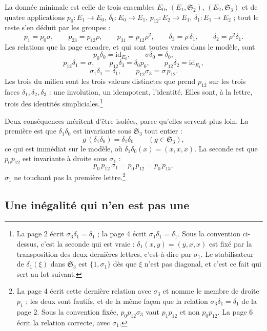 \documentclass[11pt,a4paper]{article}
\begin{document}
La donnée minimale est celle de trois ensembles $E_{0}$, $(E_{1},
\mathfrak{S}_{2})$, $(E_{2}, \mathfrak{S}_{3})$ et de quatre applications
$p_{0} \colon E_{1} \to E_{0}$, $\delta_{0} \colon E_{0} \to E_{1}$,
$p_{12} \colon E_{2} \to E_{1}$, $\delta_{1} \colon E_{1} \to E_{2}$ ; tout le
reste s'en déduit par les groupes :
\[
  p_{1} = p_{0}\sigma, \qquad
  p_{23} = p_{12}\rho, \qquad p_{31} = p_{12}\rho^{2}, \qquad
  \delta_{3} = \rho\,\delta_{1}, \qquad \delta_{2} = \rho^{2}\delta_{1}.
\]
Les relations que la page encadre, et qui sont toutes vraies dans le modèle,
sont
\[
  p_{0}\delta_{0} = \mathrm{id}_{E_{0}}, \qquad \sigma\delta_{0} = \delta_{0},
\]
\[
  p_{12}\delta_{1} = \sigma, \qquad
  p_{12}\delta_{3} = \delta_{0}p_{0}, \qquad
  p_{12}\delta_{2} = \mathrm{id}_{E_{1}},
\]
\[
  \sigma_{1}\delta_{1} = \delta_{1}, \qquad
  p_{12}\sigma_{3} = \sigma\,p_{12}.
\]
Les trois du milieu sont les trois valeurs distinctes que prend $p_{12}$ sur
les trois faces $\delta_{1}, \delta_{2}, \delta_{3}$ : une involution, un
idempotent, l'identité. Elles sont, à la lettre, trois des identités
simpliciales.\footnote{La page 2 écrit $\sigma_{3}\delta_{1} = \delta_{1}$ ; la
page 4 écrit $\sigma_{1}\delta_{1} = \delta_{1}$. Sous la convention ci-dessus,
c'est la seconde qui est vraie : $\delta_{1}(x,y) = (y,x,x)$ est fixé par la
transposition des deux dernières lettres, c'est-à-dire par $\sigma_{1}$. Le
stabilisateur de $\delta_{1}(\xi)$ dans $\mathfrak{S}_{3}$ est
$\{1,\sigma_{1}\}$ dès que $\xi$ n'est pas diagonal, et c'est ce fait qui sert
au lot suivant.}

Deux conséquences méritent d'être isolées, parce qu'elles servent plus loin.
La première est que $\delta_{1}\delta_{0}$ est invariante sous $\mathfrak{S}_{3}$
tout entier :
\[
  g\,(\delta_{1}\delta_{0}) = \delta_{1}\delta_{0}
  \qquad (g \in \mathfrak{S}_{3}),
\]
ce qui est immédiat sur le modèle, où $\delta_{1}\delta_{0}(x) = (x,x,x)$. La
seconde est que $p_{0}p_{12}$ est invariante à droite sous $\sigma_{1}$ :
\[
  p_{0}\,p_{12}\,\sigma_{1} = p_{0}\,p_{12} = p_{0}\,p_{13},
\]
$\sigma_{1}$ ne touchant pas la première lettre.\footnote{La page 4 écrit cette
dernière relation avec $\sigma_{3}$ et nomme le membre de droite $p_{1}$ ; les
deux sont fautifs, et de la même façon que la relation
$\sigma_{3}\delta_{1} = \delta_{1}$ de la page 2. Sous la convention fixée,
$p_{0}p_{12}\sigma_{3}$ vaut $p_{1}p_{12}$ et non $p_{0}p_{12}$. La page 6
écrit la relation correcte, avec $\sigma_{1}$.}

\subsection*{Une inégalité qui n'en est pas une}
\end{document}
